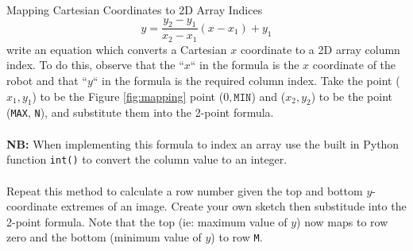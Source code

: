 \documentclass{lab}
\begin{document}
\begin{task}{Mapping Cartesian Coordinates to 2D Array Indices}{}
\begin{equation}
y = \frac{y_2 - y_1}{x_2 - x_1}(x-x_1)+y_1
\end{equation}
write an equation which converts a Cartesian $x$ coordinate to a 2D array column index. To do this, observe that the ``$x$`` in the formula is the $x$ coordinate of the robot and that ``$y$`` in the formula is the required column index. Take the point ($x_1,y_1$) to be the Figure \ref{fig:mapping} point ($0,\texttt{MIN}$) and ($x_2,y_2$) to be the point (\texttt{MAX}, \texttt{N}), and substitute them into the 2-point formula.
\\~\\
\textbf{NB:} When implementing this formula to index an array use the built in Python function \texttt{int()} to convert the column value to an integer.
\\~\\
Repeat this method to calculate a row number given the top and bottom $y$-coordinate extremes of an image. Create your own sketch then substitude into the 2-point formula. Note that the top (ie: maximum value of $y$) now maps to row zero and the bottom (minimum value of $y$) to row \texttt{M}.
\end{task}
\end{document}
